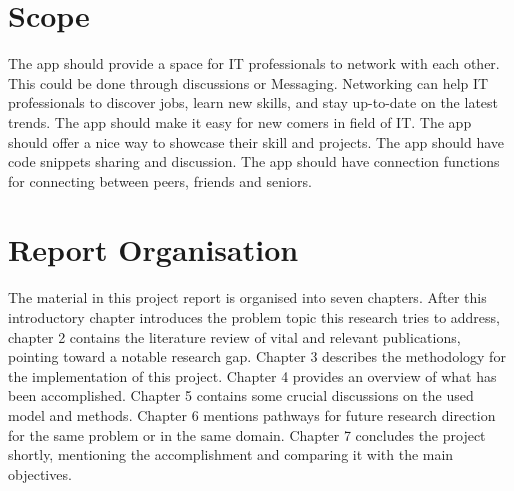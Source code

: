\section{Scope}

The app should provide a space for IT professionals to network with each other. This could be done through discussions or Messaging. Networking can help IT professionals to discover jobs, learn new skills, and stay up-to-date on the latest trends.
The app should make it easy for new comers in field of IT.
The app should offer a nice way to showcase their skill and projects.
The app should have code snippets sharing and discussion.
The app should have connection functions for connecting between peers, friends and seniors.
\section{Report Organisation}
The material in this project report is organised into seven chapters. After this introductory chapter introduces the problem topic this research tries to address, chapter 2 contains the literature review of vital and relevant publications, pointing toward a notable research gap. Chapter 3 describes the methodology for the implementation of this project. Chapter 4 provides an overview of what has been accomplished. Chapter 5 contains some crucial discussions on the used model and methods. Chapter 6 mentions pathways for future research direction for the same problem or in the same domain. Chapter 7 concludes the project shortly, mentioning the accomplishment and comparing it with the main objectives.